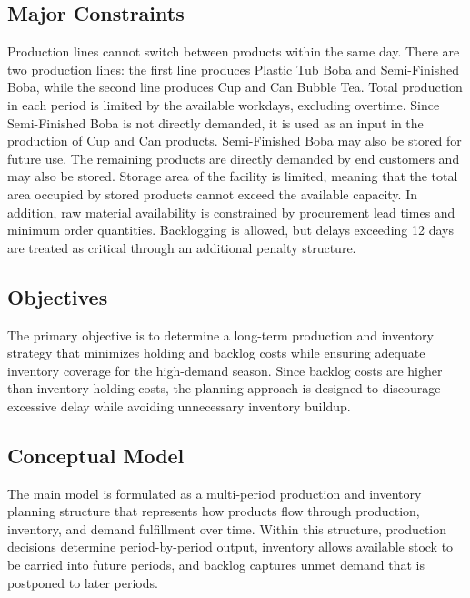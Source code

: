 \documentclass[nocoverpage]{buIE47xbooklet}
\begin{document}
\subsection{Major Constraints}
Production lines cannot switch between products within the same day. There are two production lines: the first line produces Plastic Tub Boba and Semi-Finished Boba, while the second line produces Cup and Can Bubble Tea. Total production in each period is limited by the available workdays, excluding overtime. Since Semi-Finished Boba is not directly demanded, it is used as an input in the production of Cup and Can products. Semi-Finished Boba may also be stored for future use. The remaining products are directly demanded by end customers and may also be stored. Storage area of the facility is limited, meaning that the total area occupied by stored products cannot exceed the available capacity. In addition, raw material availability is constrained by procurement lead times and minimum order quantities. Backlogging is allowed, but delays exceeding 12 days are treated as critical through an additional penalty structure.

\subsection{Objectives}

The primary objective is to determine a long-term production and inventory strategy that minimizes holding and backlog costs while ensuring adequate inventory coverage for the high-demand season. Since backlog costs are higher than inventory holding costs, the planning approach is designed to discourage excessive delay while avoiding unnecessary inventory buildup. 

\subsection{Conceptual Model}



The main model is formulated as a multi-period production and inventory planning structure that represents how products flow through production, inventory, and demand fulfillment over time. Within this structure, production decisions determine period-by-period output, inventory allows available stock to be carried into future periods, and backlog captures unmet demand that is postponed to later periods.  
\end{document}
